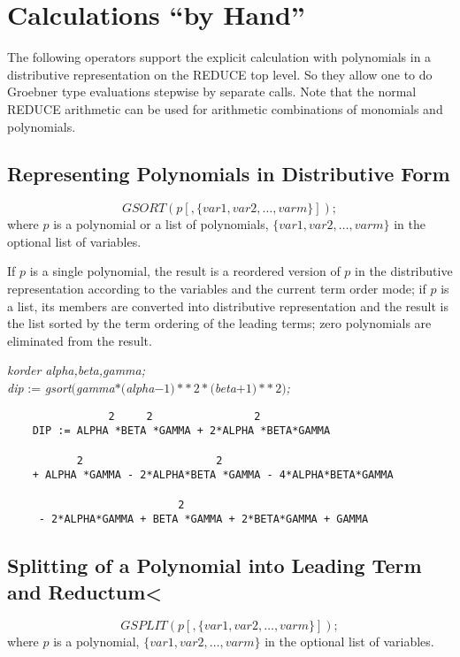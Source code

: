 \section{Calculations ``by Hand''}
The following operators support the explicit calculation with
polynomials in a distributive representation on the REDUCE top level.
So they allow one to do Groebner type evaluations stepwise by
separate calls. Note that the normal REDUCE arithmetic can be used
for arithmetic combinations of monomials and polynomials.

\subsection{Representing Polynomials in Distributive Form}
\[
 GSORT (p[,\{var1, var2, \ldots , varm\}]);
\]
where $p$ is a polynomial or a list of polynomials, $\{var1, var2,
\ldots , varm\}$ in the optional list of variables.

If $p$ is a single polynomial, the result is a reordered version of $p$
in the distributive representation according to the variables and the
current term order mode; if $p$ is a list, its members are converted
into distributive representation and the result is the list sorted by
the term ordering of the leading terms; zero polynomials are
eliminated from the result.

\example {}

{\it korder alpha,beta,gamma;}\\
{\it dip} := {\it  gsort$($gamma$*($alpha$-1)**\,2
*($beta$+1)**\,2)$;}


\begin{verbatim}
                2     2                2
    DIP := ALPHA *BETA *GAMMA + 2*ALPHA *BETA*GAMMA

           2                     2
    + ALPHA *GAMMA - 2*ALPHA*BETA *GAMMA - 4*ALPHA*BETA*GAMMA

                           2
     - 2*ALPHA*GAMMA + BETA *GAMMA + 2*BETA*GAMMA + GAMMA

 \end{verbatim}

\subsection{Splitting of a Polynomial into Leading Term and Reductum<}
\[
GSPLIT (p[,\{var1, var2,\ldots ,varm\}]);
\]
where $p$ is a polynomial, $\{var1, var2, \ldots , varm\}$ in the
optional list of variables.

